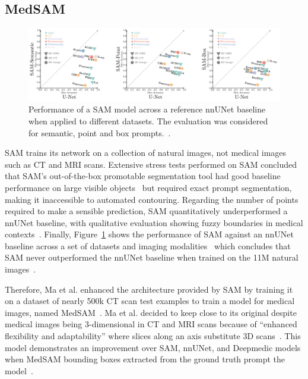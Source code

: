 \documentclass[12pt,twoside]{report}
\begin{document}
\subsection{MedSAM}\label{sect:medsam}

\begin{figure}[H]
  \centering
  \includegraphics[width=1\linewidth]{../figures/sam-performance.png}
  \caption{Performance of a SAM model across a reference nnUNet baseline when applied to different datasets. The evaluation was considered for semantic, point and box prompts.~\cite{he2023computervision}.}\label{fig:sam-performance}
\end{figure}

SAM trains its network on a collection of natural images, not medical images such as CT and MRI scans. Extensive stress tests performed on SAM concluded that SAM's out-of-the-box promotable segmentation tool had good baseline performance on large visible objects~\cite{deng2023segment} but required exact prompt segmentation, making it inaccessible to automated contouring. Regarding the number of points required to make a sensible prediction, SAM quantitatively underperformed a nnUNet baseline, with qualitative evaluation showing fuzzy boundaries in medical contexts~\cite{hu2023sam}. Finally, Figure~\ref{fig:sam-performance} shows the performance of SAM against an nnUNet baseline across a set of datasets and imaging modalities~\cite{he2023computervision} which concludes that SAM never outperformed the nnUNet baseline when trained on the 11M natural images~\cite{SAM}. 

Therefore, Ma et al. enhanced the architecture provided by SAM by training it on a dataset of nearly 500k CT scan test examples to train a model for medical images, named MedSAM~\cite{Ma2024}. Ma et al. decided to keep close to its original despite medical images being 3-dimensional in CT and MRI scans because of ``enhanced flexibility and adaptability'' where slices along an axis substitute 3D scans~\cite{Ma2024}. This model demonstrates an improvement over SAM, nnUNet, and Deepmedic models when MedSAM bounding boxes extracted from the ground truth prompt the model~\cite{Ma2024}.
\end{document}
